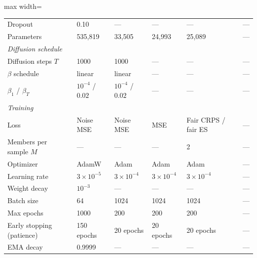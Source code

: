 \begin{table}[h]
\begin{adjustbox}{max width=\textwidth}
\begin{tabular}{llllll}
\quad Dropout                 & 0.10               & ---                   & ---                   & ---                   & ---            \\
\quad Parameters              & 535,819            & 33,505                & 24,993                & 25,089                & ---            \\
\midrule
\multicolumn{6}{l}{\textit{Diffusion schedule}} \\
\quad Diffusion steps $T$     & 1000               & 1000                  & ---                   & ---                   & ---            \\
\quad $\beta$ schedule        & linear             & linear                & ---                   & ---                   & ---            \\
\quad $\beta_1$ / $\beta_T$   & $10^{-4}$ / $0.02$ & $10^{-4}$ / $0.02$    & ---                   & ---                   & ---            \\
\midrule
\multicolumn{6}{l}{\textit{Training}} \\
\quad Loss                    & Noise MSE          & Noise MSE             & MSE                   & Fair CRPS / fair ES   & ---            \\
\quad Members per sample $M$  & ---                & ---                   & ---                   & 2                     & ---            \\
\quad Optimizer               & AdamW              & Adam                  & Adam                  & Adam                  & ---            \\
\quad Learning rate           & $3 \times 10^{-5}$ & $3 \times 10^{-4}$    & $3 \times 10^{-4}$    & $3 \times 10^{-4}$    & ---            \\
\quad Weight decay            & $10^{-3}$          & ---                   & ---                   & ---                   & ---            \\
\quad Batch size              & 64                 & 1024                  & 1024                  & 1024                  & ---            \\
\quad Max epochs              & 1000               & 200                   & 200                   & 200                   & ---            \\
\quad Early stopping (patience) & 150 epochs       & 20 epochs             & 20 epochs             & 20 epochs             & ---            \\
\quad EMA decay               & 0.9999             & ---                   & ---                   & ---                   & ---            \\

\end{tabular}
\end{adjustbox}
\end{table}
